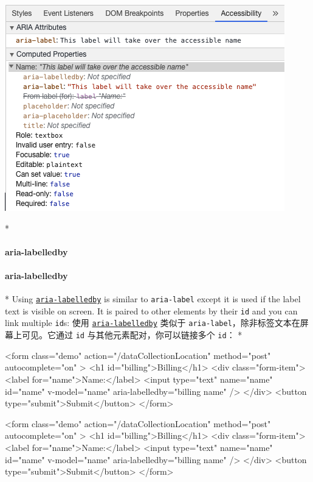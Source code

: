 \begin{center} 
\includegraphics{./img/AccessibleARIAlabelDevTools.2b376a03.png} 
\end{center}
    
 
\begin{paracol}{2} 
 
\switchcolumn[0]*%
\paragraph{aria-labelledby}
\switchcolumn
\paragraph{aria-labelledby}
\switchcolumn[0]*%
Using
\href{https://developer.mozilla.org/en-US/docs/Web/Accessibility/ARIA/Attributes/aria-labelledby}{\texttt{aria-labelledby}}
is similar to \texttt{aria-label} except it is used if the label text is
visible on screen. It is paired to other elements by their \texttt{id}
and you can link multiple \texttt{id}s:
\switchcolumn
使用
\href{https://developer.mozilla.org/en-US/docs/Web/Accessibility/ARIA/Attributes/aria-labelledby}{\texttt{aria-labelledby}}
类似于 \texttt{aria-label}，除非标签文本在屏幕上可见。它通过 \texttt{id}
与其他元素配对，你可以链接多个 \texttt{id}：
\switchcolumn[0]*%
\begin{codeHtml}
<form
  class="demo"
  action="/dataCollectionLocation"
  method="post"
  autocomplete="on"
>
  <h1 id="billing">Billing</h1>
  <div class="form-item">
    <label for="name">Name:</label>
    <input
      type="text"
      name="name"
      id="name"
      v-model="name"
      aria-labelledby="billing name"
    />
  </div>
  <button type="submit">Submit</button>
</form>
\end{codeHtml}
\switchcolumn
\begin{codeHtml}
<form
  class="demo"
  action="/dataCollectionLocation"
  method="post"
  autocomplete="on"
>
  <h1 id="billing">Billing</h1>
  <div class="form-item">
    <label for="name">Name:</label>
    <input
      type="text"
      name="name"
      id="name"
      v-model="name"
      aria-labelledby="billing name"
    />
  </div>
  <button type="submit">Submit</button>
</form>
\end{codeHtml}
\end{paracol}

